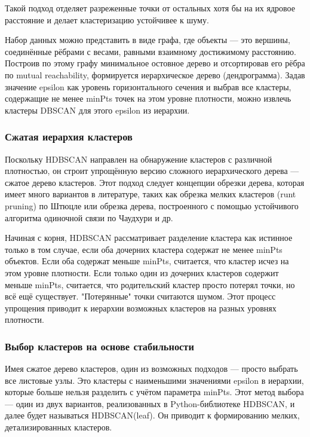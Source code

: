 Такой подход отделяет разреженные точки от остальных хотя бы на их ядровое расстояние и делает кластеризацию устойчивее к шуму.





Набор данных можно представить в виде графа, где объекты — это вершины, соединённые рёбрами с весами, равными взаимному достижимому расстоянию. Построив по этому графу минимальное остовное дерево и отсортировав его рёбра по mutual reachability, формируется иерархическое дерево (дендрограмма). Задав значение epsilon как уровень горизонтального сечения и выбрав все кластеры, содержащие не менее minPts точек на этом уровне плотности, можно извлечь кластеры DBSCAN для этого epsilon из иерархии.

\subsubsection{Сжатая иерархия кластеров}

Поскольку HDBSCAN направлен на обнаружение кластеров с различной плотностью, он строит упрощённую версию сложного иерархического дерева — сжатое дерево кластеров. Этот подход следует концепции обрезки дерева, которая имеет много вариантов в литературе, таких как обрезка мелких кластеров (runt pruning) по Штюцле или обрезка дерева, построенного с помощью устойчивого алгоритма одиночной связи по Чаудхури и др.

Начиная с корня, HDBSCAN рассматривает разделение кластера как истинное только в том случае, если оба дочерних кластера содержат не менее minPts объектов. Если оба содержат меньше minPts, считается, что кластер исчез на этом уровне плотности. Если только один из дочерних кластеров содержит меньше minPts, считается, что родительский кластер просто потерял точки, но всё ещё существует. "Потерянные" точки считаются шумом. Этот процесс упрощения приводит к иерархии возможных кластеров на разных уровнях плотности.


\subsubsection{Выбор кластеров на основе стабильности}

Имея сжатое дерево кластеров, один из возможных подходов — просто выбрать все листовые узлы. Это кластеры с наименьшими значениями epsilon в иерархии, которые больше нельзя разделить с учётом параметра minPts. Этот метод выбора — один из двух вариантов, реализованных в Python-библиотеке HDBSCAN, и далее будет называться HDBSCAN(leaf). Он приводит к формированию мелких, детализированных кластеров.

